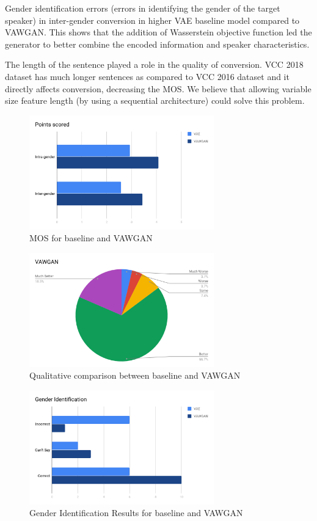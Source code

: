 \documentclass[letterpaper]{article}
\begin{document}
Gender identification errors (errors in identifying the gender of the target speaker) in inter-gender conversion in higher VAE baseline model compared to VAWGAN. This shows that the addition of Wasserstein objective function led the generator to better combine the encoded information and speaker characteristics.

The length of the sentence played a role in the quality of conversion. VCC 2018 dataset has much longer sentences as compared to VCC 2016 dataset and it directly affects conversion, decreasing the MOS. We believe that allowing variable size feature length (by using a sequential architecture) could solve this problem.

\begin{figure}[h]
	\includegraphics[width=8cm]{images/MOS}
    \caption{MOS for baseline and VAWGAN}
	\label{fig:mos}
\end{figure}

\begin{figure}[h]
	\includegraphics[width=8cm]{images/VAWGAN_versus_VAE}
    \caption{Qualitative comparison between baseline and VAWGAN}
	\label{fig:comparison}
\end{figure}

\begin{figure}[h]
	\includegraphics[width=8cm]{images/Gender_Identification}
    \caption{Gender Identification Results for baseline and VAWGAN}
	\label{fig:gender}
\end{figure}
\end{document}
